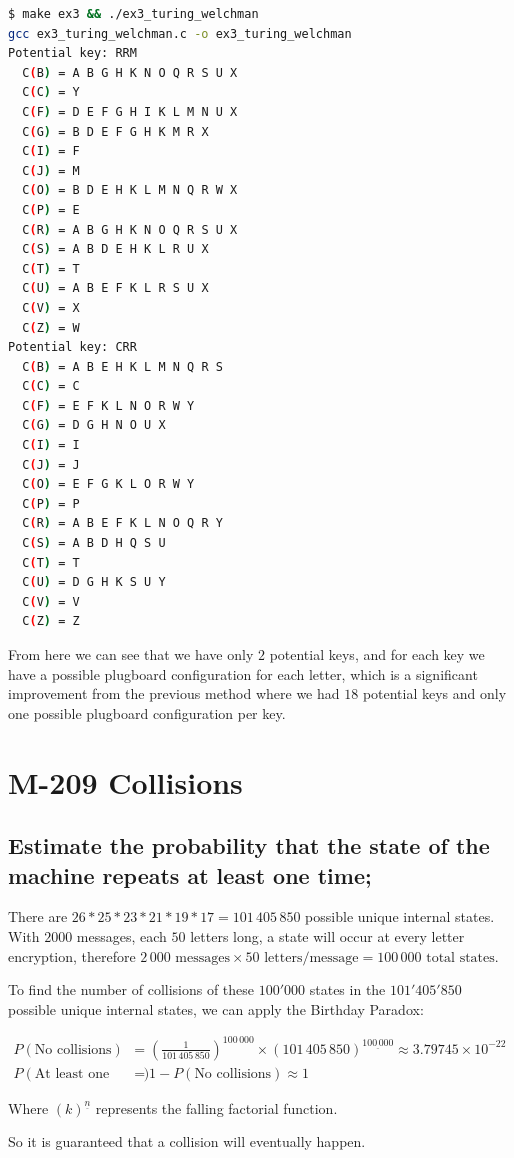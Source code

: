 \documentclass{article}
\begin{document}
\begin{lstlisting}[language=bash]
$ make ex3 && ./ex3_turing_welchman
gcc ex3_turing_welchman.c -o ex3_turing_welchman
Potential key: RRM
  C(B) = A B G H K N O Q R S U X 
  C(C) = Y 
  C(F) = D E F G H I K L M N U X 
  C(G) = B D E F G H K M R X 
  C(I) = F 
  C(J) = M 
  C(O) = B D E H K L M N Q R W X 
  C(P) = E 
  C(R) = A B G H K N O Q R S U X 
  C(S) = A B D E H K L R U X 
  C(T) = T 
  C(U) = A B E F K L R S U X 
  C(V) = X 
  C(Z) = W 
Potential key: CRR
  C(B) = A B E H K L M N Q R S 
  C(C) = C 
  C(F) = E F K L N O R W Y 
  C(G) = D G H N O U X 
  C(I) = I 
  C(J) = J 
  C(O) = E F G K L O R W Y 
  C(P) = P 
  C(R) = A B E F K L N O Q R Y 
  C(S) = A B D H Q S U 
  C(T) = T 
  C(U) = D G H K S U Y 
  C(V) = V 
  C(Z) = Z 
\end{lstlisting}
From here we can see that we have only $2$ potential keys, and for each key we have a possible plugboard configuration for each letter, which is a significant improvement from the previous method where we had $18$ potential keys and only one possible plugboard configuration per key.

\section{M-209 Collisions}
\subsection{Estimate the probability that the state of the machine repeats at least one time;}
There are $26*25*23*21*19*17 = 101\,405\,850$ possible unique internal states.
With $2000$ messages, each $50$ letters long, a state will occur at every letter encryption, therefore $2\,000 \text{ messages} \times 50 \text{ letters/message} = 100\,000 \text{ total states}$.

To find the number of collisions of these $100'000$ states in the $101'405'850$ possible unique internal states, we can apply the Birthday Paradox:

\begin{align*}
    P(\text{No collisions}) &= \left(\frac{1}{101\,405\,850}\right)^{100\,000} \times (101\,405\,850)^{\underline{100\,000}} \approx 3.79745 \times 10^{-22} \\
    P(\text{At least one collision}) &= 1 - P(\text{No collisions}) \approx 1
\end{align*}

Where $(k)^{\underline{n}}$ represents the falling factorial function.

So it is guaranteed that a collision will eventually happen.
\end{document}
